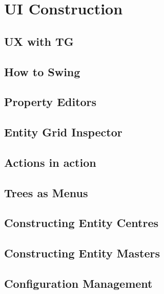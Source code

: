 \chapter{UI Construction}\label{ch01:03}

\section{UX with TG}

\section{How to Swing}

\section{Property Editors}

\section{Entity Grid Inspector}

\section{Actions in action}

\section{Trees as Menus}

\section{Constructing Entity Centres}

\section{Constructing Entity Masters}

\section{Configuration Management}


